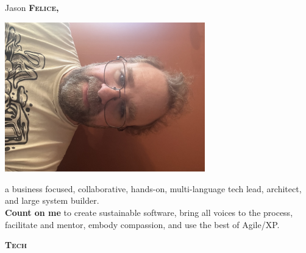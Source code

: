 \documentclass[11pt, letterpaper]{article}
\newcommand{\headleft}[1]{\vspace*{3ex}\textsc{\textbf{#1}}\par%
    \vspace*{-1.5ex}\hrulefill\par\vspace*{0.7ex}}
\begin{document}
\setlength{\topskip}{0pt}
\setlength{\parindent}{0pt}
\setlength{\parskip}{0pt}
\setlength{\fboxsep}{0pt}
\pagestyle{empty}
\raggedbottom

\begin{minipage}[t]{0.33\textwidth} %
\colorbox{cvblue}{\begin{minipage}[t][5mm][t]{\textwidth}\null\hfill\null\end{minipage}}

\vspace{-.25ex} %
\colorbox{cvblue!90}{\color{white}  %
\textwidth\relax%
\begin{minipage}[t][\dimexpr\textheight-5mm\relax][t]{0.82\textwidth}
\raggedright
\vspace*{2.5ex}

\null\hfill\Huge{Jason \textbf{\textsc{Felice,}}}\normalsize\hfill\null

\null\hfill\includegraphics[width=0.65\textwidth]{profile.jpg}\hfill\null

\vspace*{0.5ex} %

{\small
a business focused, collaborative, hands-on, multi-language tech lead, architect, and large system builder. \\[2ex]

{\bf Count on me} to create sustainable software, bring all voices to the process, facilitate and mentor, embody compassion, and use the best of Agile/XP. \\
}

\headleft{Tech}

\vspace*{-4ex}


\end{minipage}}
\end{minipage}
\end{document}
